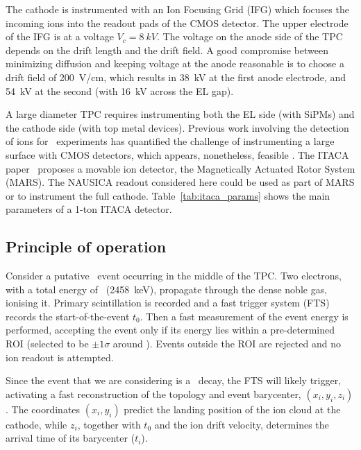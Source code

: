 \documentclass[11pt,a4paper]{article}
\begin{document}
The cathode is instrumented with an Ion Focusing Grid (IFG) which focuses the incoming ions into the readout pads of the CMOS detector. The upper electrode of the IFG is at a voltage $V_c = \SI{8}{kV}$. The voltage on the anode side of the TPC depends on the drift length and the drift field. A good compromise between minimizing diffusion and keeping voltage at the anode reasonable is to choose a drift field of \SI{200}{V/cm}, which results in \SI{38}{kV} at the first anode electrode, and \SI{54}{kV} at the second (with \SI{16}{kV} across the EL gap). 
 
 
 A large diameter TPC requires instrumenting both the EL side (with SiPMs) and the cathode side (with top metal devices). 
  Previous work involving the detection of
 ions for \bbonu\ experiments \cite{Nygren_2018, mei2020topmetalcmosdirectcharge} has quantified the challenge of instrumenting a large surface with CMOS detectors, which appears, nonetheless, feasible \cite{You2021}. The ITACA paper~\cite{itaca2026} proposes a movable ion detector, the Magnetically Actuated Rotor System (MARS). The NAUSICA readout considered here could be used as part of MARS or to instrument the full cathode.  Table~\ref{tab:itaca_params} shows the main parameters of a 1-ton ITACA detector. 

\subsection{Principle of operation}
\label{sec:pof}

Consider a putative \bbonu\ event occurring in the middle of the TPC. Two electrons, with a total energy of \Qbb\ (\SI{2458}{keV}), propagate through the dense noble gas, ionising it. Primary scintillation is recorded and a fast trigger system (FTS) records the start-of-the-event $t_0$. Then a fast measurement of the event energy is performed, accepting the event only if its energy lies within a pre-determined ROI (selected to be $\pm 1\sigma$ around \Qbb). Events outside the ROI are rejected and no ion readout is attempted.

Since the event that we are considering is a \bbonu\ decay, the FTS will likely trigger, activating a fast reconstruction of the topology and event barycenter, $(x_i, y_i, z_i)$. The coordinates $(x_i,y_i)$ predict the landing position of the ion cloud at the cathode, while $z_i$, together with $t_0$ and the ion drift velocity, determines the arrival time of its barycenter ($t_i$). 
\end{document}
